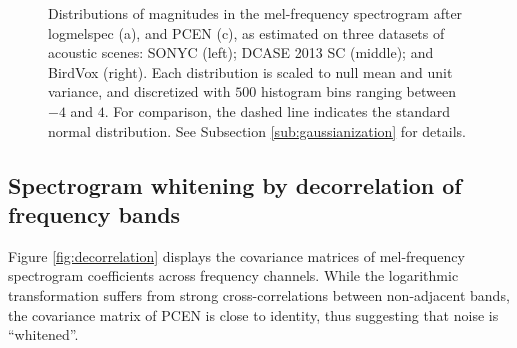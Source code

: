 \documentclass[journal]{IEEEtran}
\theoremstyle{remark}
\begin{document}
\begin{figure}
\caption{Distributions of magnitudes in the mel-frequency spectrogram after logmelspec (a),  and PCEN (c), as estimated on three datasets of acoustic scenes:
SONYC (left); DCASE 2013 SC (middle); and BirdVox (right).
Each distribution is scaled to null mean and unit variance, and discretized with $500$ histogram bins ranging between $-4$ and $4$.
For comparison, the dashed line indicates the standard normal distribution.
See Subsection \ref{sub:gaussianization} for details.}
\label{fig:gaussianization}
\end{figure}

\subsection{Spectrogram whitening by decorrelation of frequency bands}\label{sub:decorrelation}
Figure \ref{fig:decorrelation} displays the covariance matrices of mel-frequency spectrogram coefficients across frequency channels.
While the logarithmic transformation suffers from strong cross-correlations between non-adjacent bands, the covariance matrix of PCEN is close to identity, thus suggesting that noise is  ``whitened''.
\end{document}
